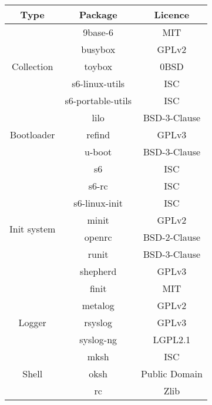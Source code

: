 \begin{table}[!h]
    \centering
    \begin{tabular}{|c|c|c|}
        \hline
        Type & Package & Licence \\
        \hline
        \hline
        \multirow{5}{*}{Collection} & 9base-6 \cite{9base} & MIT \\
        \cline{2-3}
        & busybox \cite{busybox} & GPLv2 \\
        \cline{2-3}
        & toybox \cite{toybox} & 0BSD \\
        \cline{2-3}
        & s6-linux-utils \cite{s6-linux} & ISC \\
        \cline{2-3}
        & s6-portable-utils \cite{s6-portable} & ISC \\
        \hline
        \multirow{3}{*}{Bootloader} & lilo \cite{lilo} & BSD-3-Clause \\
        \cline{2-3}
        & refind \cite{refind} & GPLv3 \\
        \cline{2-3}
        & u-boot \cite{uboot} & BSD-3-Clause \\
        \hline
        \multirow{8}{*}{Init system} & s6 \cite{s6} & ISC \\
        \cline{2-3}
        & s6-rc \cite{s6-rc} & ISC \\
        \cline{2-3}
        & s6-linux-init \cite{s6-linux-init} & ISC \\
        \cline{2-3}
        & minit \cite{minit} & GPLv2 \\
        \cline{2-3}
        & openrc \cite{openrc} & BSD-2-Clause \\
        \cline{2-3}
        & runit \cite{runit} & BSD-3-Clause \\
        \cline{2-3}
        & shepherd \cite{shepherd} & GPLv3 \\
        \cline{2-3}
        & finit \cite{finit} & MIT \\
        \hline
        \multirow{3}{*}{Logger} & metalog \cite{metalog} & GPLv2 \\
        \cline{2-3}
        & rsyslog \cite{rsyslog} & GPLv3 \\
        \cline{2-3}
        & syslog-ng \cite{syslog-ng} & LGPL2.1 \\
        \hline
        \multirow{4}{*}{Shell} & mksh \cite{mksh} & ISC \\
        \cline{2-3}
        & oksh \cite{oksh} & Public Domain \\
        \cline{2-3}
        & rc \cite{rc} & Zlib \\

\end{tabular}
\end{table}

